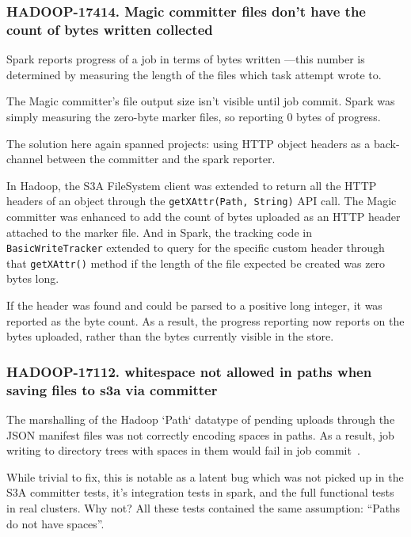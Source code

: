 \documentclass[conference]{IEEEtran}
\begin{document}
\subsubsection{HADOOP-17414. Magic committer files don't have the count of bytes written collected}

Spark reports progress of a job in terms of bytes written ---this number is determined by measuring the length of the files which task attempt wrote to.

The Magic committer's file output size isn't visible until job commit.
Spark was simply measuring the zero-byte marker files, so reporting 0 bytes of progress.

The solution here again spanned projects: using HTTP object headers as a back-channel between the committer and the spark reporter.
\ \cite{HADOOP-17414, SPARK-33739}

In Hadoop, the S3A FileSystem client was extended to return all the HTTP headers of an object through the \texttt{getXAttr(Path, String)} API call.
The Magic committer was enhanced to add the count of bytes uploaded as an HTTP header attached to the marker file.
And in Spark, the tracking code in \texttt{BasicWriteTracker} extended to query for the specific custom header through that \texttt{getXAttr()} method if the length of the file expected be created was zero bytes long.

If the header was found and could be parsed to a positive long integer, it was reported as the byte count.
As a result, the progress reporting now reports on the bytes uploaded, rather than the bytes currently visible in the store.

\subsubsection{HADOOP-17112. whitespace not allowed in paths when saving files to s3a via committer}

The marshalling of the Hadoop `Path` datatype of pending uploads through the JSON manifest
files was not correctly encoding spaces in paths. As a result, job writing to directory
trees with spaces in them would fail in job commit\ \cite{HADOOP-17112}.

While trivial to fix, this is notable as a latent bug which was not picked
up in the S3A committer tests, it's integration tests in spark, and the full
functional tests in real clusters.
Why not?
All these tests contained the same assumption: ``Paths do not have spaces''.
\end{document}
